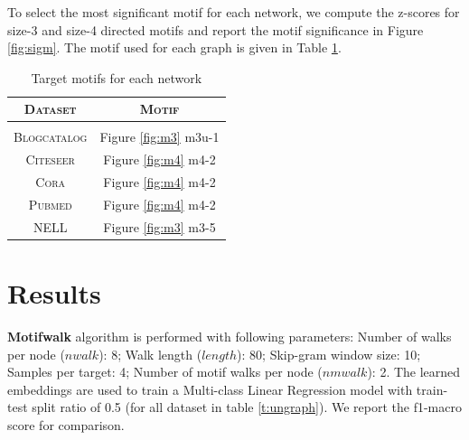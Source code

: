 \documentclass{article}
\theoremstyle{definition}
\begin{document}
\begin{table}
\centering
{}
\setlength{\belowcaptionskip}{-10pt}
\caption{Datasets for semi-supervised embeddings}
\label{t:segraph}
\end{table}
To select the most significant motif for each network, we compute the z-scores for
size-3 and size-4 directed motifs and report the motif significance
in Figure \ref{fig:sigm}. The motif used for each graph is given in Table
\ref{t:motifs}.
\begin{table}
\centering
\begin{tabular}{c c}
\textsc{Dataset} & \textsc{Motif} \\
\hline \\
\textsc{Blogcatalog} & Figure \ref{fig:m3} m3u-1 \\
\textsc{Citeseer} & Figure \ref{fig:m4} m4-2 \\
\textsc{Cora} & Figure \ref{fig:m4} m4-2 \\
\textsc{Pubmed} & Figure \ref{fig:m4} m4-2 \\
\textsc{NELL} & Figure \ref{fig:m3} m3-5 \\
\end{tabular}%
\caption{Target motifs for each network}
\label{t:motifs}
\end{table}
\section{Results}
\textbf{Motifwalk} algorithm is performed with following parameters: Number of
walks per node ($nwalk$): 8; Walk length ($length$): 80; Skip-gram window size:
10; Samples per target: 4;  Number of motif walks per node ($nmwalk$): 2. The
learned embeddings are used to train a Multi-class Linear Regression model with
train-test split ratio of 0.5 (for all dataset in table \ref{t:ungraph}). We report
the f1-macro score for comparison.
\end{document}
